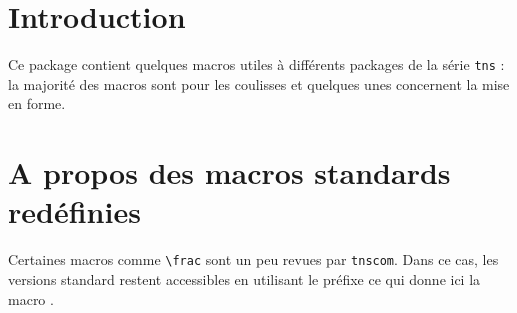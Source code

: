 \documentclass[12pt,a4paper]{article}
\begin{document}
\section{Introduction}

Ce package contient quelques macros utiles à différents packages de la série \verb+tns+ : la majorité des macros sont pour les coulisses et quelques unes concernent la mise en forme.




\section{A propos des macros standards redéfinies}

Certaines macros comme \verb+\frac+ sont un peu revues par \verb+tnscom+.
Dans ce cas, les versions standard restent accessibles en utilisant le préfixe  ce qui donne ici la macro .
\end{document}
